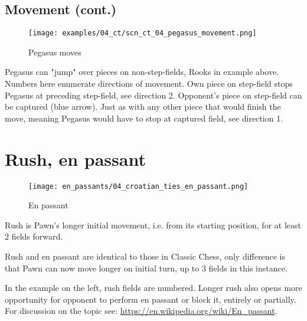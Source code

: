 \clearpage %

\subsection*{Movement (cont.)}
\label{sec:Croatian Ties/Pegasus/Movement (cont.)}

\noindent
\begin{figure}[!h]
\vspace{-1.2\baselineskip}
\texttt{[image: examples/04\_ct/scn\_ct\_04\_pegasus\_movement.png]}
\caption{Pegasus moves}
\label{fig:scn_ct_04_pegasus_movement}
\end{figure}

Pegasus can "jump" over pieces on non-step-fields, Rooks in example above. Numbers
here enumerate directions of movement. Own piece on step-field stops Pegasus at
preceding step-field, see direction 2. Opponent's piece on step-field can be captured
(blue arrow). Just as with any other piece that would finish the move, meaning Pegasus
would have to stop at captured field, see direction 1.

\clearpage %

\section*{Rush, en passant}
\label{sec:Croatian Ties/Rush, en passant}

\noindent
\begin{wrapfigure}{l}{0.4\textwidth}
\centering
\texttt{[image: en\_passants/04\_croatian\_ties\_en\_passant.png]}
\caption{En passant}
\label{fig:04_croatian_ties_en_passant}
\end{wrapfigure}
Rush is Pawn's longer initial movement, i.e. from its starting position, for at least
2 fields forward.

Rush and en passant are identical to those in Classic Chess, only difference is that Pawn
can now move longer on initial turn, up to 3 fields in this instance.

In the example on the left, rush fields are numbered. Longer rush also opens more opportunity
for opponent to perform en passant or block it, entirely or partially. For discussion on the
topic see:
\href{https://en.wikipedia.org/wiki/En\_passant}{https://en.wikipedia.org/wiki/En\_passant}.

